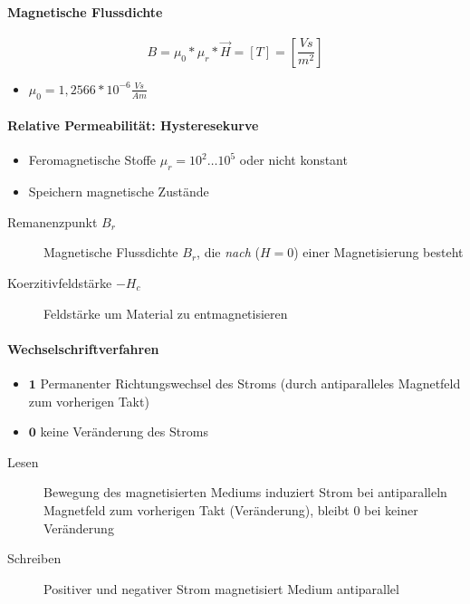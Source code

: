 \paragraph{Magnetische Flussdichte}

$$B = \mu_0 * \mu_r * \vec{H} = [T] = \left[\frac{Vs}{m^2}\right]$$

\begin{itemize}
  \item $\mu_0 = 1,2566 * 10^{-6} \frac{Vs}{Am}$
\end{itemize}

\paragraph{Relative Permeabilität: Hysteresekurve}

\begin{itemize}
  \item Feromagnetische Stoffe $\mu_r = 10^2 \dots 10^5$ oder nicht konstant
  \item Speichern magnetische Zustände
\end{itemize}

\begin{description}
  \item[Remanenzpunkt $B_r$] Magnetische Flussdichte $B_r$, die \emph{nach} ($H = 0$) einer Magnetisierung besteht
  \item[Koerzitivfeldstärke $-H_c$] Feldstärke um Material zu entmagnetisieren
\end{description}

\paragraph{Wechselschriftverfahren}

\begin{itemize}
  \item $\mathbf{1}$ Permanenter Richtungswechsel des Stroms (durch antiparalleles Magnetfeld zum vorherigen Takt)
  \item $\mathbf{0}$ keine Veränderung des Stroms
\end{itemize}

\begin{description}
  \item[Lesen] Bewegung des magnetisierten Mediums induziert Strom bei antiparalleln Magnetfeld zum vorherigen Takt (Veränderung), bleibt $0$ bei keiner Veränderung
  \item[Schreiben] Positiver und negativer Strom magnetisiert Medium antiparallel
\end{description}

